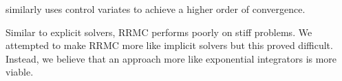 \documentclass[a4paper,12pt]{article}
\begin{document}
\begin{related}[CV RRMC]
  \cite{daun_randomized_2011} similarly uses control variates to achieve
  a higher order of convergence.
\end{related}

Similar to explicit solvers, RRMC performs poorly on stiff problems.
We attempted to make RRMC more like implicit solvers but this proved difficult.
Instead, we believe that an approach more like exponential integrators
is more viable.








\end{document}
